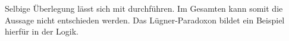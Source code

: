 Selbige Überlegung lässt sich mit \F{} durchführen. Im Gesamten kann somit die Aussage nicht entschieden werden. Das Lügner-Paradoxon bildet ein Beispiel hierfür in der Logik.
%
%
